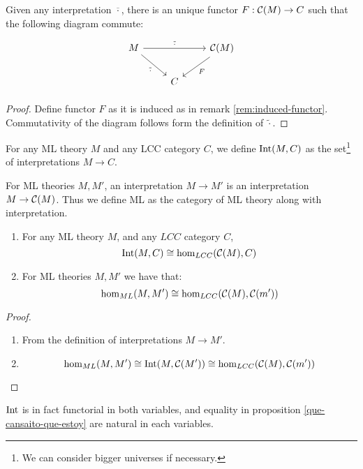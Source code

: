 \begin{definition}
\begin{proposition}
  Given any interpretation $\overline \cdot$, there is an unique functor $F:\mathcal{C} (M) \to C$ such that the following diagram commute:
        \[
        \begin{tikzpicture}
          \node {\begin{tikzcd}
              M \ar[rr,"\tilde \cdot "]\ar[rd,swap, "\overline \cdot "] &  & \CC (M) \ar[ld, "F"] \\
              &   C &
            \end{tikzcd}};
        \end{tikzpicture}
      \]
\end{proposition}
\begin{proof}
Define functor $F$ as it is induced as in remark \ref{rem:induced-functor}. Commutativity of the diagram follows form the definition of $\tilde \cdot$.
\end{proof}

\begin{definition}
For any ML theory $M$ and any LCC category $C$, we define $\operatorname{Int}(M,C)$ as the set\footnote{We can consider bigger universes if necessary.} of interpretations $M\to C$.
\end{definition}

\begin{definition}
  For ML theories $M,M'$,  an interpretation $M\to M'$ is an interpretation $M\to \mathcal{C} (M)$. Thus we define ML as the category of ML theory along with interpretation.
\end{definition}

\begin{proposition}\label{que-cansaito-que-estoy}
  \begin{enumerate}
  \item For any ML theory $M$, and any $LCC$ category $C$,
    $$  \operatorname{Int} (M,C) \cong \hom_{LCC} (\mathcal{C}(M), C)$$
  \item For ML theories $M,M'$ we have that:
    $$ \hom_{ML}(M,M') \cong \hom_{LCC}(\mathcal{C}(M),\mathcal{C}(m'))$$
  \end{enumerate}
\end{proposition}
\begin{proof}
  \begin{enumerate}
  \item From the definition of interpretations $M\to M'$.
  \item     $$ \hom_{ML}(M,M') \cong \operatorname{Int}(M, \mathcal{C}(M'))\cong \hom_{LCC}(\mathcal{C}(M),\mathcal{C}(m'))$$
  \end{enumerate}
\end{proof}
\begin{remark}
  $\operatorname{Int}$ is in fact functorial in both variables, and equality in proposition \ref{que-cansaito-que-estoy} are natural in each variables.
\end{remark}


\end{definition}
